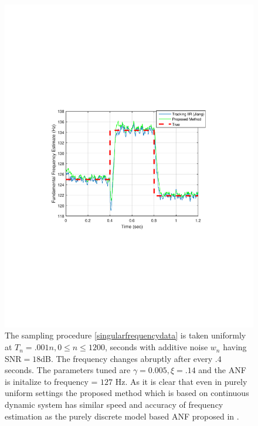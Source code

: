 \documentclass{UCF_ETD}
\begin{document}
\begin{figure}[H]
\begin{center}
\includegraphics[scale=0.8]{NonuniformANF/newCompetitiveANFComp}
\caption{The sampling  procedure
\eqref{singularfrequencydata} is taken uniformly at   $T_n=.001 n, 0\le n\le 1200$, seconds
with additive noise $w_n$ having SNR$=18$dB. The frequency changes abruptly after every $.4$ seconds. The parameters tuned are $\gamma = 0.005, \xi  = .14$ and the ANF is initalize to frequency = $127$ Hz. As it is clear that even in purely uniform settings the proposed method which is based on continuous dynamic system has similar speed and accuracy of frequency estimation as the purely discrete model based ANF proposed in \cite{tanjiang09}.
}
\label{newCompetitiveANFComp.fig}
\end{center}
\end{figure}
\end{document}
